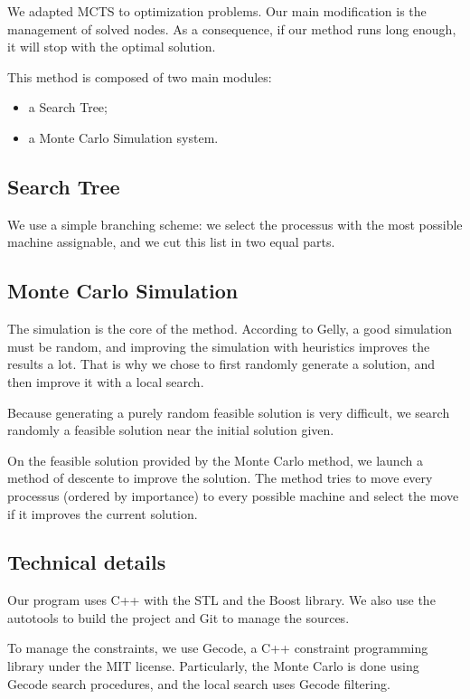 \documentclass[a4paper,twocolumn]{article}
\begin{document}
We adapted MCTS to optimization problems. Our main modification is
the management of solved nodes.  As a consequence, if our method runs
long enough, it will stop with the optimal solution.

This method is composed of two main modules:
\begin{itemize}
\item a Search Tree;
\item a Monte Carlo Simulation system.
\end{itemize}

\subsection{Search Tree}

We use a simple branching scheme: we select the processus with the
most possible machine assignable, and we cut this list in two equal
parts.

\subsection{Monte Carlo Simulation}

The simulation is the core of the method.  According to
Gelly\cite{gelly2007contribution}, a good simulation must be random, and
improving the simulation with heuristics improves the results a lot.
That is why we chose to first randomly generate a solution, and
then improve it with a local search.

Because generating a purely random feasible solution is very
difficult, we search randomly a feasible solution near the
initial solution given.

On the feasible solution provided by the Monte Carlo method, we launch
a method of descente to improve the solution.  The method tries to move
every processus (ordered by importance) to every possible machine and
select the move if it improves the current solution.

\subsection{Technical details}

Our program uses C++ with the STL and the Boost library.  We also use
the autotools to build the project and Git to manage the sources.

To manage the constraints, we use Gecode, a C++ constraint programming
library under the MIT license.  Particularly, the Monte Carlo is done
using Gecode search procedures, and the local search uses Gecode
filtering.
\end{document}
